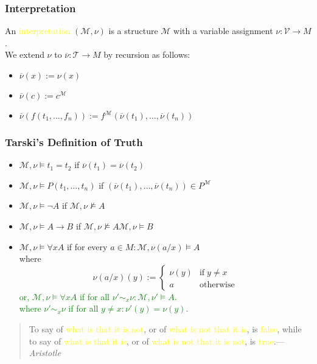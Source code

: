 \documentclass[UTF8,aspectratio=43,11pt,colorlinks,compress,openany]{beamer}%
\begin{document}
\begin{frame}\frametitle{Interpretation}
		An \textcolor{yellow}{interpretation} $(\mathcal{M},\nu)$ is a structure $\mathcal{M}$ with a variable assignment $\nu:\mathcal{V}\to M$.\\
		We extend $\nu$ to $\overline{\nu}:\mathcal{T}\to M$ by recursion as follows:\\
		\vspace{2ex}
		\begin{block}{}
			\begin{itemize}
				\item $\overline{\nu}(x):=\nu(x)$
				\item $\overline{\nu}(c):=c^{\mathcal{M}}$
				\item $\overline{\nu}(f(t_1,\dots,f_n)):=f^{\mathcal{M}}(\overline{\nu}(t_1),\dots,\overline{\nu}(t_n))$
			\end{itemize}
		\end{block}
		\centering{}
\end{frame}

\begin{frame}\frametitle{Tarski's Definition of Truth}
		\begin{definition}
			\begin{itemize}
				\item $\mathcal{M},\nu\vDash t_1=t_2$ if $\overline{\nu}(t_1)=\overline{\nu}(t_2)$
				\item $\mathcal{M},\nu\vDash P(t_1,\dots,t_n)$ if $(\overline{\nu}(t_1),\dots,\overline{\nu}(t_n))\in P^{\mathcal{M}}$
				\item $\mathcal{M},\nu\vDash\neg A$ if $\mathcal{M},\nu\nvDash A$
				\item $\mathcal{M},\nu\vDash A\to B$ if $\mathcal{M},\nu\nvDash A$\;\;\;\;$\mathcal{M},\nu\vDash B$
				\item $\mathcal{M},\nu\vDash\forall x A$ if for every $a\in M: \mathcal{M},\nu(a/x)\vDash A$\\
				where
				\[\nu(a/x)(y):=
				\begin{cases}
				\nu(y) &\text{if}\;y\neq x\\
				a &\text{otherwise}
				\end{cases}\]
				\textcolor{green}{or,
					$\mathcal{M},\nu\vDash\forall x A$ if for all $\nu'\sim_x\nu: \mathcal{M},\nu'\vDash A$.\\
					where $\nu'\sim_x\nu$ if for all $y\neq x:\nu'(y)=\nu(y)$.}
			\end{itemize}
		\end{definition}
	\begin{quote}
	To say of \textcolor{yellow}{what is that it is not}, or of \textcolor{yellow}{what is not that it is}, is \textcolor{yellow}{false}, while to say of \textcolor{yellow}{what is that it is}, or of \textcolor{yellow}{what is not that it is not}, is \textcolor{yellow}{true}.\hfill --- \textsl{Aristotle}
	\end{quote}
\end{frame}
\end{document}
